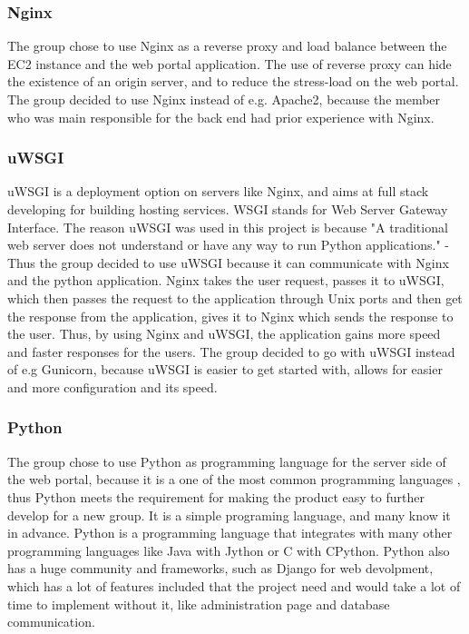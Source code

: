 \subsubsection{Nginx}
The group chose to use Nginx \cite{nginx} as a reverse proxy and load balance between the EC2 instance and the web portal application. The use of reverse proxy can hide the existence of an origin server, and to reduce the stress-load on the web portal. The group decided to use Nginx instead of e.g. Apache2, because the member who was main responsible for the back end had prior experience with Nginx.

\subsubsection{uWSGI}
uWSGI\cite{uWSGI} is a deployment option on servers like Nginx, and aims at full stack developing for building hosting services. WSGI stands for Web Server Gateway Interface. The reason uWSGI was used in this project is because "A traditional web server does not understand or have any way to run Python applications." - \cite{whyUseWSGI} Thus the group decided to use uWSGI because it can communicate with Nginx and the python application. Nginx takes the user request, passes it to uWSGI, which then passes the request to the application through Unix ports and then get the response from the application, gives it to Nginx which sends the response to the user. Thus, by using Nginx and uWSGI, the application gains more speed and faster responses for the users. The group decided to go with uWSGI instead of e.g Gunicorn, because uWSGI is easier to get started with, allows for easier and more configuration and its speed.


\subsubsection{Python}
\label{python}
The group chose to use Python \cite{python} as programming language for the server side of the web portal, because it is a one of the most common programming languages \cite{Programminglanguagespopularity}, thus Python meets the requirement for making the product easy to further develop for a new group. It is a simple programing language, and many know it in advance. Python is a programming language that integrates with many other programming languages like Java with Jython or C with CPython. Python also has a huge community and frameworks, such as Django for web devolpment, which has a lot of features included that the project need and would take a lot of time to implement without it, like administration page and database communication.

